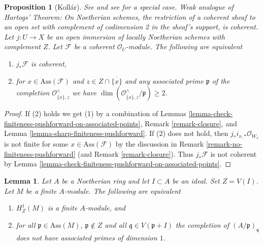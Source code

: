 \documentclass{stacks-project}
\newenvironment{reference}{\comment}{\endcomment}
\newenvironment{slogan}{\comment}{\endcomment}
\theoremstyle{plain}
\newtheorem{proposition}[subsection]{Proposition}
\newtheorem{lemma}[subsection]{Lemma}
\theoremstyle{definition}
\theoremstyle{remark}
\numberwithin{equation}{subsection}
\begin{document}
\begin{proposition}[Koll\'ar]
\label{proposition-kollar}
\begin{reference}
See \cite{k-coherent} and see \cite[IV, Proposition 7.2.2]{EGA}
for a special case.
\end{reference}
\begin{slogan}
Weak analogue of Hartogs' Theorem: On Noetherian schemes, the
restriction of a coherent sheaf to an open set with complement
of codimension 2 in the sheaf's support, is coherent.
\end{slogan}
Let $j : U \to X$ be an open immersion of locally Noetherian schemes
with complement $Z$. Let $\mathcal{F}$ be a coherent $\mathcal{O}_U$-module.
The following are equivalent
\begin{enumerate}
\item $j_*\mathcal{F}$ is coherent,
\item for $x \in \text{Ass}(\mathcal{F})$ and
$z \in Z \cap \overline{\{x\}}$ and any associated prime
$\mathfrak p$ of the completion $\mathcal{O}_{\overline{\{x\}}, z}^\wedge$
we have $\dim(\mathcal{O}_{\overline{\{x\}}, z}^\wedge/\mathfrak p) \geq 2$.
\end{enumerate}
\end{proposition}

\begin{proof}
If (2) holds we get (1) by a combination of
Lemmas \ref{lemma-check-finiteness-pushforward-on-associated-points},
Remark \ref{remark-closure}, and
Lemma \ref{lemma-sharp-finiteness-pushforward}.
If (2) does not hold, then $j_*i_{x, *}\mathcal{O}_{W_x}$ is not finite
for some $x \in \text{Ass}(\mathcal{F})$ by the discussion in
Remark \ref{remark-no-finiteness-pushforward}
(and Remark \ref{remark-closure}).
Thus $j_*\mathcal{F}$ is not coherent by
Lemma \ref{lemma-check-finiteness-pushforward-on-associated-points}.
\end{proof}

\begin{lemma}
\label{lemma-kollar-finiteness-H1-local}
Let $A$ be a Noetherian ring and let $I \subset A$ be an ideal.
Set $Z = V(I)$. Let $M$ be a finite $A$-module. The following
are equivalent
\begin{enumerate}
\item $H^1_Z(M)$ is a finite $A$-module, and
\item for all $\mathfrak p \in \text{Ass}(M)$, $\mathfrak p \not \in Z$
and all $\mathfrak q \in V(\mathfrak p + I)$ the completion of
$(A/\mathfrak p)_\mathfrak q$ does not have associated primes
of dimension $1$.
\end{enumerate}
\end{lemma}
\end{document}
